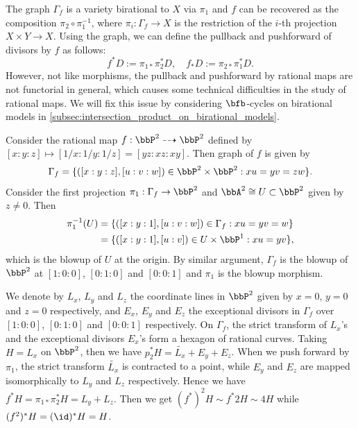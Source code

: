   The graph $\Gamma_f$ is a variety birational to $X$ via $\pi_1$ and $f$ can be recovered as the composition $\pi_2 \circ \pi_1^{-1}$, where $\pi_i: \Gamma_f \to X$ is the restriction of the $i$-th projection $X \times Y \to X$.
  Using the graph, we can define the pullback and pushforward of divisors by $f$ as follows:
  \[ f^*D := \pi_{1*} \pi_2^* D, \quad f_*D := \pi_{2*} \pi_1^* D. \]
  However, not like morphisms, the pullback and pushforward by rational maps are not functorial in general, which causes some technical difficulties in the study of rational maps.
  We will fix this issue by considering $\bfb$-cycles on birational models in \cref{subsec:intersection_product_on_birational_models}.

  \begin{example}
    Consider the rational map $f: \bbP^2 \dashrightarrow \bbP^2$ defined by $[x:y:z] \mapsto [1/x:1/y:1/z] = [yz:xz:xy]$.
    Then graph of $f$ is given by 
    \[ \Gamma_f = \{ ([x:y:z], [u:v:w]) \in \bbP^2 \times \bbP^2 : xu = yv = zw \}. \]
    Consider the first projection $\pi_1: \Gamma_f \to \bbP^2$ and $\bbA^2 \cong U \subset \bbP^2$ given by $z \neq 0$.
    Then 
    \begin{align*}
      \pi_1^{-1}(U) & = \{ ([x:y:1], [u:v:w]) \in \Gamma_f : xu = yv = w \} \\
      & = \{ ([x:y:1], [u:v]) \in U \times \bbP^1 : xu = yv \},
    \end{align*} 
    which is the blowup of $U$ at the origin.
    By similar argument, $\Gamma_f$ is the blowup of $\bbP^2$ at $[1:0:0]$, $[0:1:0]$ and $[0:0:1]$ and $\pi_1$ is the blowup morphism.

    We denote by $L_x$, $L_y$ and $L_z$ the coordinate lines in $\bbP^2$ given by $x=0$, $y=0$ and $z=0$ respectively, 
    and $E_x$, $E_y$ and $E_z$ the exceptional divisors in $\Gamma_f$ over $[1:0:0]$, $[0:1:0]$ and $[0:0:1]$ respectively.
    On $\Gamma_f$, the strict transform of $L_x$'s and the exceptional divisors $E_x$'s form a hexagon of rational curves.
    Taking $H = L_x$ on $\bbP^2$, then we have $p_2^* H = \tilde{L_x} + E_y + E_z$.
    When we push forward by $\pi_1$, the strict transform $\tilde{L_x}$ is contracted to a point, while $E_y$ and $E_z$ are mapped isomorphically to $L_y$ and $L_z$ respectively.
    Hence we have $f^* H = \pi_{1*} \pi_2^* H = L_y + L_z$.
    Then we get $(f^*)^2 H \sim f^*2H \sim 4H$ while $(f^2)^*H = (\id)^* H = H$.
  \end{example}

